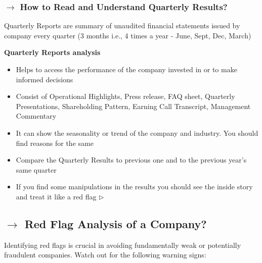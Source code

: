 \documentclass[12pt]{article}
\begin{document}
\subsubsection*{$\rightarrow$ How to Read and Understand Quarterly Results?}

Quarterly Reports are summary of unaudited financial statements issued by company every quarter (3 months i.e., 4 times a year - June, Sept, Dec, March)

\textbf{Quarterly Reports analysis}

\begin{itemize}
    \item Helps to access the performance of the company invested in or to make informed decisions
    \item Consist of Operational Highlights, Press release, FAQ sheet, Quarterly Presentations, Shareholding Pattern, Earning Call Transcript, Management Commentary
    \item It can show the seasonality or trend of the company and industry. You should find reasons for the same
    \item Compare the Quarterly Results to previous one and to the previous year's same quarter
    \item If you find some manipulations in the results you should see the inside story and treat it like a red flag $\triangleright$
\end{itemize}



\subsection*{$\rightarrow$ Red Flag Analysis of a Company?}

Identifying red flags is crucial in avoiding fundamentally weak or potentially fraudulent companies. Watch out for the following warning signs:
\end{document}
